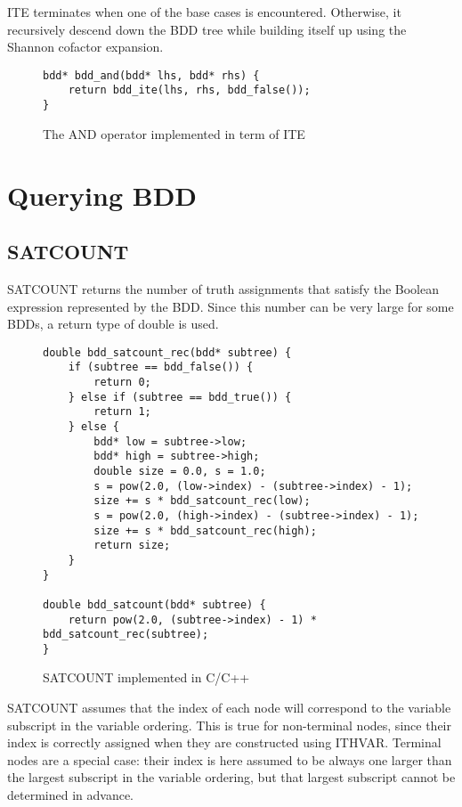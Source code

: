 \documentclass[12pt]{article}
\begin{document}
ITE terminates when one of the base cases is encountered. Otherwise, it recursively descend down the BDD tree while building itself up using the Shannon cofactor expansion.

\begin{figure}[h!]
\begin{lstlisting}	
bdd* bdd_and(bdd* lhs, bdd* rhs) {
    return bdd_ite(lhs, rhs, bdd_false());
}
\end{lstlisting}
\caption{The AND operator implemented in term of ITE}
\end{figure}

\section{Querying BDD}
\subsection{SATCOUNT}
SATCOUNT returns the number of truth assignments that satisfy the Boolean expression represented by the BDD. Since this number can be very large for some BDDs, a return type of double is used.
\begin{figure}[h!]
\begin{lstlisting}
double bdd_satcount_rec(bdd* subtree) {
    if (subtree == bdd_false()) {
        return 0;
    } else if (subtree == bdd_true()) {
        return 1;
    } else {
        bdd* low = subtree->low;
        bdd* high = subtree->high;
        double size = 0.0, s = 1.0;
        s = pow(2.0, (low->index) - (subtree->index) - 1);
        size += s * bdd_satcount_rec(low);
        s = pow(2.0, (high->index) - (subtree->index) - 1);
        size += s * bdd_satcount_rec(high);
        return size;
    }
}

double bdd_satcount(bdd* subtree) {
    return pow(2.0, (subtree->index) - 1) * bdd_satcount_rec(subtree);
}
\end{lstlisting}
\caption{SATCOUNT implemented in C/C++}
\end{figure}

SATCOUNT assumes that the index of each node will correspond to the variable subscript in the variable ordering. This is true for non-terminal nodes, since their index is correctly assigned when they are constructed using ITHVAR. Terminal nodes are a special case: their index is here assumed to be always one larger than the largest subscript in the variable ordering, but that largest subscript cannot be determined in advance.
\end{document}
